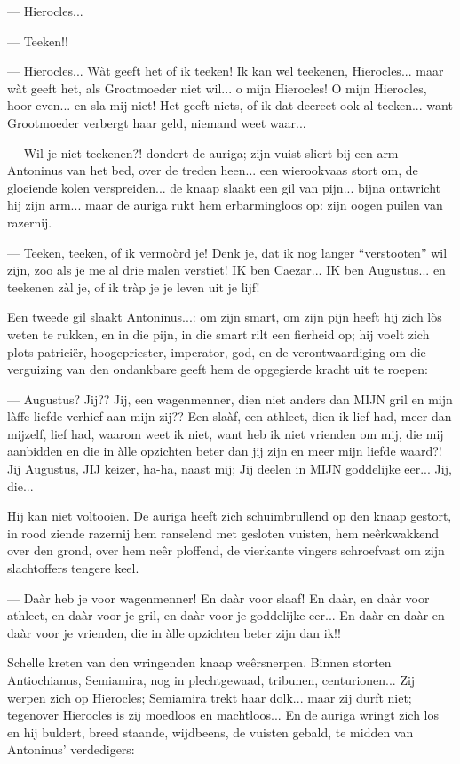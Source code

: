 \documentclass[a4paper, 12pt, oneside, dutch]{article}
\begin{document}
--- Hierocles...

--- Teeken!!

--- Hierocles... Wàt geeft het of ik teeken! Ik kan wel teekenen, Hierocles... maar wàt geeft het, als Grootmoeder niet wil... o mijn Hierocles! O mijn Hierocles, hoor even... en sla mij niet! Het geeft niets, of ik dat decreet ook al teeken... want Grootmoeder verbergt haar geld, niemand weet waar...

--- Wil je niet teekenen?! dondert de auriga; zijn vuist sliert bij een arm Antoninus van het bed, over de treden heen... een wierookvaas stort om, de gloeiende kolen verspreiden... de knaap slaakt een gil van pijn... bijna ontwricht hij zijn arm... maar de auriga rukt hem erbarmingloos op: zijn oogen puilen van razernij.

--- Teeken, teeken, of ik vermoòrd je! Denk je, dat ik nog langer "`verstooten"' wil zijn, zoo als je me al drie malen verstiet! IK ben Caezar... IK ben Augustus... en teekenen zàl je, of ik tràp je je leven uit je lijf!

Een tweede gil slaakt Antoninus...: om zijn smart, om zijn pijn heeft hij zich lòs weten te rukken, en in die pijn, in die smart rilt een fierheid op; hij voelt zich plots patriciër, hoogepriester, imperator, god, en de verontwaardiging om die verguizing van den ondankbare geeft hem de opgegierde kracht uit te roepen:

--- Augustus? Jij?? Jij, een wagenmenner, dien niet anders dan MIJN gril en mijn làffe liefde verhief aan mijn zij?? Een slaàf, een athleet, dien ik lief had, meer dan mijzelf, lief had, waarom weet ik niet, want heb ik niet vrienden om mij, die mij aanbidden en die in àlle opzichten beter dan jij zijn en meer mijn liefde waard?! Jij Augustus, JIJ keizer, ha-ha, naast mij; Jij deelen in MIJN goddelijke eer... Jij, die...

Hij kan niet voltooien. De auriga heeft zich schuimbrullend op den knaap gestort, in rood ziende razernij hem ranselend met gesloten vuisten, hem neêrkwakkend over den grond, over hem neêr ploffend, de vierkante vingers schroefvast om zijn slachtoffers tengere keel.

--- Daàr heb je voor wagenmenner! En daàr voor slaaf! En daàr, en daàr voor athleet, en daàr voor je gril, en daàr voor je goddelijke eer... En daàr en daàr en daàr voor je vrienden, die in àlle opzichten beter zijn dan ik!!

Schelle kreten van den wringenden knaap weêrsnerpen. Binnen storten Antiochianus, Semiamira, nog in plechtgewaad, tribunen, centurionen... Zij werpen zich op Hierocles; Semiamira trekt haar dolk... maar zij durft niet; tegenover Hierocles is zij moedloos en machtloos... En de auriga wringt zich los en hij buldert, breed staande, wijdbeens, de vuisten gebald, te midden van Antoninus' verdedigers:
\end{document}

